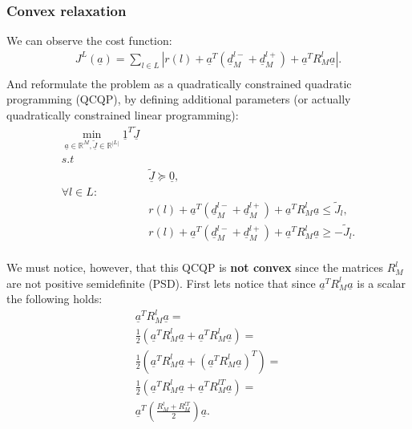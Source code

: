 \documentclass[journal,onecolumn]{IEEEtran}
\newcommand{\field}[1]{\mathbb{#1}}
\begin{document}
\subsubsection{Convex relaxation}
We can observe the cost function:
\begin{align*}
J^{L}(\underline{a}) = \sum\limits_{l\in L}{|r(l) + \underline{a}^T\left( \underline{d}_M^{l-} + \underline{d}_M^{l+} \right) + \underline{a}^T R_M^l\underline{a}|}. \\
\end{align*}
And reformulate the problem as a quadratically constrained quadratic programming (QCQP), by defining additional parameters (or actually quadratically constrained linear programming):
\begin{align*}
\min\limits_{\underline{a}\in\field{R}^M,\underline{\widetilde{J}}\in\field{R}^{|L|}} \underline{1}^T \underline{\widetilde{J}} & \\
s.t & \\
& \underline{\widetilde{J}}\succeq \underline{0}, \\
\forall l\in L: & \\
& r(l) + \underline{a}^T\left( \underline{d}_M^{l-} + \underline{d}_M^{l+} \right) + \underline{a}^T R_M^l\underline{a} \leq \widetilde{J}_l, \\
& r(l) + \underline{a}^T\left( \underline{d}_M^{l-} + \underline{d}_M^{l+} \right) + \underline{a}^T R_M^l\underline{a} \geq -\widetilde{J}_l. \\
\end{align*}

We must notice, however, that this QCQP is \textbf{not convex} since the matrices $R_M^l$ are not positive semidefinite (PSD). First lets notice that since $\underline{a}^T R_M^l\underline{a}$ is a scalar the following holds:
\begin{align*}
\underline{a}^T R_M^l\underline{a} = \\
\frac{1}{2}\left( \underline{a}^T R_M^l\underline{a} + \underline{a}^T R_M^l\underline{a}\right) = \\
\frac{1}{2}\left( \underline{a}^T R_M^l\underline{a} + \left(\underline{a}^T R_M^l\underline{a}\right)^T \right) = \\
\frac{1}{2}\left( \underline{a}^T R_M^l\underline{a} + \underline{a}^T R_M^{lT}\underline{a} \right) = \\
\underline{a}^T \left( \frac{R_M^l + R_M^{lT}}{2} \right) \underline{a}.
\end{align*}
\end{document}
